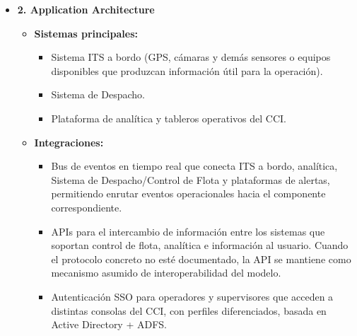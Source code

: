 \begin{singlespace}
\begin{itemize}
\begin{itemize}
\begin{itemize}
\begin{itemize}
				\item Repositorio o fuente autoritativa de posición, estado y programación de la flota, evitando duplicidades y contradicciones entre sistemas.
				\item Integridad y trazabilidad de los datos que soportan decisiones de despacho y regulación.
			\end{itemize}
			\item[$\Rightarrow$] \textbf{Plataforma de analítica y tableros operativos del CCI:}
			\begin{itemize}
				\item Disponibilidad y actualización en tiempo casi real.
				\item Minimización de datos personales en los indicadores.
			\end{itemize}
		\end{itemize}
	\end{itemize}
	\item \textbf{2. Application Architecture}
	\begin{itemize}
		\item \textbf{Sistemas principales:}
		\begin{itemize}
			\item[$\Rightarrow$] Sistema ITS a bordo (GPS, cámaras y demás sensores o equipos disponibles que produzcan información útil para la operación).
			\item[$\Rightarrow$] Sistema de Despacho.
			\item[$\Rightarrow$] Plataforma de analítica y tableros operativos del CCI.
		\end{itemize}
		\item \textbf{Integraciones:}
		\begin{itemize}
			\item[$\Rightarrow$] Bus de eventos en tiempo real que conecta ITS a bordo, analítica, Sistema de Despacho/Control de Flota y plataformas de alertas, permitiendo enrutar eventos operacionales hacia el componente correspondiente.
			\item[$\Rightarrow$] APIs para el intercambio de información entre los sistemas que soportan control de flota, analítica e información al usuario. Cuando el protocolo concreto no esté documentado, la API se mantiene como mecanismo asumido de interoperabilidad del modelo.
			\item[$\Rightarrow$] Autenticación SSO para operadores y supervisores que acceden a distintas consolas del CCI, con perfiles diferenciados, basada en Active Directory + ADFS.
		\end{itemize}
	\end{itemize}
\end{itemize}


\end{singlespace}
